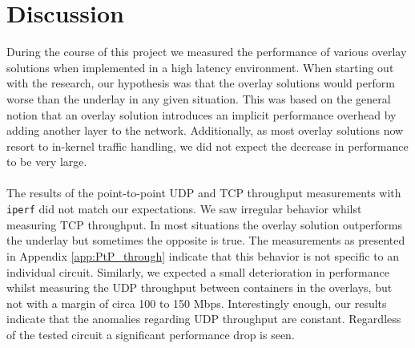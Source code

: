 \section{Discussion} \label{discussion}
During the course of this project we measured the performance of various overlay solutions when implemented in a high latency environment. When starting out with the research, our hypothesis was that the overlay solutions would perform worse than the underlay in any given situation. This was based on the general notion that an overlay solution introduces an implicit performance overhead by adding another layer to the network. Additionally, as most overlay solutions now resort to in-kernel traffic handling, we did not expect the decrease in performance to be very large. 
\\\\
The results of the point-to-point UDP and TCP throughput measurements with \texttt{iperf} did not match our expectations. We saw irregular behavior whilst measuring TCP throughput. In most situations the overlay solution outperforms the underlay but sometimes the opposite is true. The measurements as presented in Appendix \ref{app:PtP_through} indicate that this behavior is not specific to an individual circuit. Similarly, we expected a small deterioration in performance whilst measuring the UDP throughput between containers in the overlays, but not with a margin of circa 100 to 150 Mbps. Interestingly enough, our results indicate that the anomalies regarding UDP throughput are constant. Regardless of the tested circuit a significant performance drop is seen. 

